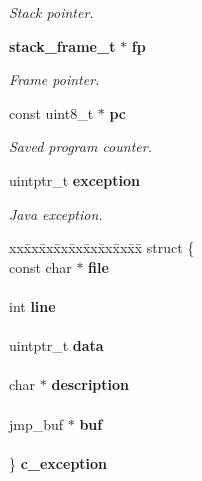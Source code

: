 \begin{DoxyCompactItemize}
\begin{DoxyCompactList}\small\item\em Stack pointer. \item\end{DoxyCompactList}\item 
{\bf stack\_\-frame\_\-t} $\ast$ {\bf fp}\label{structthread__t_a27d4161ad9848186a50d9a137c4d7f83}

\begin{DoxyCompactList}\small\item\em Frame pointer. \item\end{DoxyCompactList}\item 
const uint8\_\-t $\ast$ {\bf pc}\label{structthread__t_a3fbfd5c6e97c7745283b1964cfba6461}

\begin{DoxyCompactList}\small\item\em Saved program counter. \item\end{DoxyCompactList}\item 
uintptr\_\-t {\bf exception}\label{structthread__t_ac8114a936cf535b8ff926a77b90a92c8}

\begin{DoxyCompactList}\small\item\em Java exception. \item\end{DoxyCompactList}\item 
\begin{tabbing}
xx\=xx\=xx\=xx\=xx\=xx\=xx\=xx\=xx\=\kill
struct \{\\
\>const char $\ast$ {\bf file}\\
\>\\
\>int {\bf line}\\
\>\\
\>uintptr\_t {\bf data}\\
\>\\
\>char $\ast$ {\bf description}\\
\>\\
\>jmp\_buf $\ast$ {\bf buf}\\
\>\\
\} {\bf c\_exception}\label{structthread__t_a01a1c0dc3ec032cec94ac55b6ac50341}
\\


\end{tabbing}
\end{DoxyCompactItemize}
